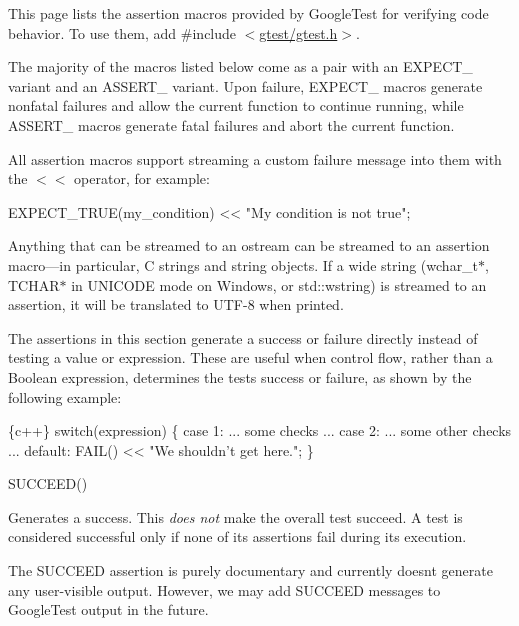 This page lists the assertion macros provided by Google\+Test for verifying code behavior. To use them, add {\ttfamily \#include $<$\mbox{\hyperlink{gtest_8h_source}{gtest/gtest.\+h}}$>$}.

The majority of the macros listed below come as a pair with an {\ttfamily E\+X\+P\+E\+C\+T\+\_\+} variant and an {\ttfamily A\+S\+S\+E\+R\+T\+\_\+} variant. Upon failure, {\ttfamily E\+X\+P\+E\+C\+T\+\_\+} macros generate nonfatal failures and allow the current function to continue running, while {\ttfamily A\+S\+S\+E\+R\+T\+\_\+} macros generate fatal failures and abort the current function.

All assertion macros support streaming a custom failure message into them with the {\ttfamily $<$$<$} operator, for example\+:


\begin{DoxyCode}
EXPECT\_TRUE(my\_condition) << \textcolor{stringliteral}{"My condition is not true"};
\end{DoxyCode}


Anything that can be streamed to an {\ttfamily ostream} can be streamed to an assertion macro—in particular, C strings and string objects. If a wide string ({\ttfamily wchar\+\_\+t$\ast$}, {\ttfamily T\+C\+H\+A\+R$\ast$} in {\ttfamily U\+N\+I\+C\+O\+DE} mode on Windows, or {\ttfamily std\+::wstring}) is streamed to an assertion, it will be translated to U\+T\+F-\/8 when printed.

The assertions in this section generate a success or failure directly instead of testing a value or expression. These are useful when control flow, rather than a Boolean expression, determines the test\textquotesingle{}s success or failure, as shown by the following example\+:


\begin{DoxyCode}
\{c++\}
switch(expression) \{
  case 1:
    ... some checks ...
  case 2:
    ... some other checks ...
  default:
    FAIL() << "We shouldn't get here.";
\}
\end{DoxyCode}


{\ttfamily S\+U\+C\+C\+E\+E\+D()}

Generates a success. This {\itshape does not} make the overall test succeed. A test is considered successful only if none of its assertions fail during its execution.

The {\ttfamily S\+U\+C\+C\+E\+ED} assertion is purely documentary and currently doesn\textquotesingle{}t generate any user-\/visible output. However, we may add {\ttfamily S\+U\+C\+C\+E\+ED} messages to Google\+Test output in the future.

